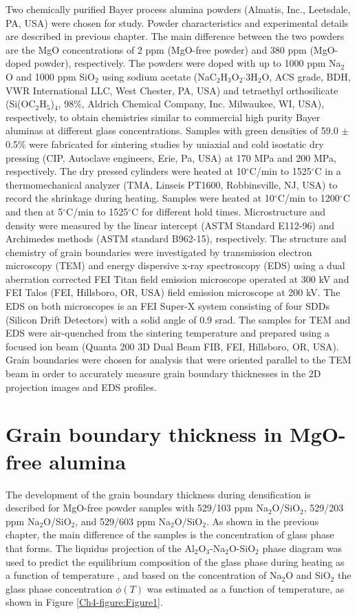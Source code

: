 Two chemically purified Bayer process alumina powders (Almatis, Inc., Leetsdale, PA, USA) were chosen for study. Powder characteristics and experimental details are described in previous chapter. The main difference between the two powders are the MgO concentrations of 2 ppm (MgO-free powder) and 380 ppm (MgO-doped powder), respectively. The powders were doped with up to 1000 ppm Na$_{2}$O and 1000 ppm SiO$_{2}$ using sodium acetate (NaC$_{2}$H$_{3}$O$_{2}$$\cdot$3H$_{2}$O, ACS grade, BDH, VWR International LLC, West Chester, PA, USA) and tetraethyl orthosilicate (Si(OC$_{2}$H$_{5}$)$_{4}$, 98\%, Aldrich Chemical Company, Inc. Milwaukee, WI, USA), respectively, to obtain chemistries similar to commercial high purity Bayer aluminas at different glass concentrations. Samples with green densities of 59.0 $\pm$ 0.5\% were fabricated for sintering studies by uniaxial and cold isostatic dry pressing (CIP, Autoclave engineers, Erie, Pa, USA) at 170 MPa and 200 MPa, respectively. The dry pressed cylinders were heated at 10$^{\circ}$C/min to 1525$^{\circ}$C in a thermomechanical analyzer (TMA, Linseis PT1600, Robbinsville, NJ, USA) to record the shrinkage during heating. Samples were heated at 10$^{\circ}$C/min to 1200$^{\circ}$C and then at 5$^{\circ}$C/min to 1525$^{\circ}$C for different hold times. Microstructure and density were measured by the linear intercept (ASTM Standard E112-96) \cite{Standard2013} and Archimedes methods (ASTM standard B962-15), \cite{Standard2015} respectively. The structure and chemistry of grain boundaries were investigated by transmission electron microscopy (TEM) and energy dispersive x-ray spectroscopy (EDS) using a dual aberration corrected FEI Titan \cite{Clarke1987} field emission microscope operated at 300 kV and FEI Talos (FEI, Hillsboro, OR, USA) field emission microscope at 200 kV. The EDS on both microscopes is an FEI Super-X system consisting of four SDDs (Silicon Drift Detectors) with a solid angle of 0.9 srad. The samples for TEM and EDS were air-quenched from the sintering temperature and prepared using a focused ion beam (Quanta 200 3D Dual Beam FIB, FEI, Hillsboro, OR, USA).  Grain boundaries were chosen for analysis that were oriented parallel to the TEM beam in order to accurately measure grain boundary thicknesses in the 2D projection images and EDS profiles.

\section{Grain boundary thickness in MgO-free alumina}
The development of the grain boundary thickness during densification is described for MgO-free powder samples with 529/103 ppm Na$_{2}$O/SiO$_{2}$, 529/203 ppm Na$_{2}$O/SiO$_{2}$, and 529/603 ppm Na$_{2}$O/SiO$_{2}$. As shown in the previous chapter, the main difference of the samples is the concentration of glass phase that forms. The liquidus projection of the Al$_{2}$O$_{3}$-Na$_{2}$O-SiO$_{2}$ phase diagram \cite{Svoboda1996} was used to predict the equilibrium composition of the glass phase during heating as a function of temperature \cite{Frueh2016a}, and based on the concentration of Na$_{2}$O and SiO$_{2}$ the glass phase concentration $\phi(T)$ was estimated as a function of temperature, as shown in Figure \ref{Ch4-figure:Figure1}. 

